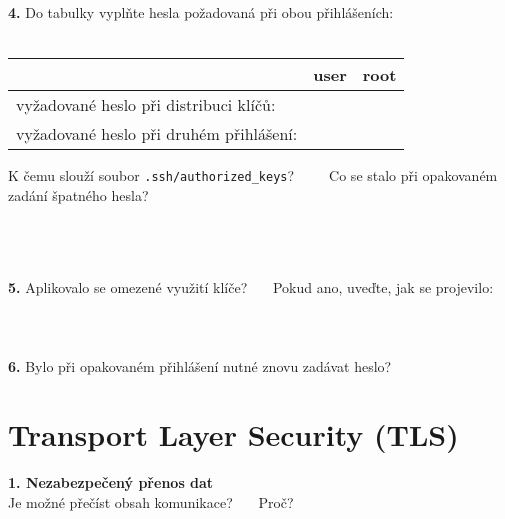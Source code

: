 \documentclass[a4paper,11pt]{article}
\begin{document}
\textbf{4.} Do tabulky vyplňte hesla požadovaná při obou přihlášeních:\\
~\\
\begin{tabular}{|l|c|c|}
\hline
~ & user & root \\
\hline
vyžadované heslo při distribuci klíčů: & \hspace{3cm} & \hspace{3cm} \\
\hline
vyžadované heslo při druhém přihlášení: & \hspace{3cm} & \hspace{3cm} \\
\hline
\end{tabular}

\bigskip
K čemu slouží soubor \texttt{.ssh/authorized\_keys}?~~~~~Co se stalo při opakovaném zadání špatného hesla?
~\\
~\\
~\\
\underline{\hspace{7.8cm}}~\hspace{0.5cm}~\underline{\hspace{8.4cm}}

\newpage %

\textbf{5.} Aplikovalo se omezené využití klíče? \underline{\hspace{1cm}} ~~~Pokud ano, uveďte, jak se projevilo:
~\\
~\\
~\\
\underline{\hspace{16.5cm}}
~\\


\textbf{6.} Bylo při opakovaném přihlášení nutné znovu zadávat heslo? \underline{\hspace{1cm}}


\section{Transport Layer Security (TLS)}

\textbf{1. Nezabezpečený přenos dat}\\
Je možné přečíst obsah komunikace? \underline{\hspace{1cm}}~~~Proč?~\underline{\hspace{8cm}}
\end{document}
